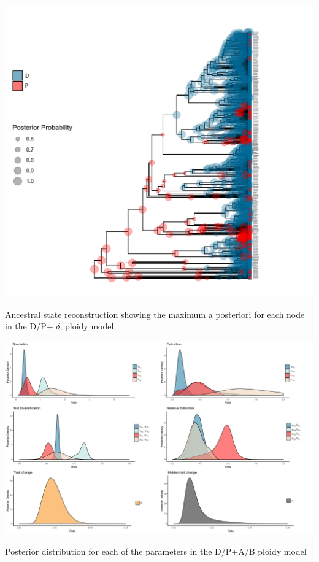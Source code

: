 \begin{suppfigure}
\includegraphics[width=\textwidth]{asrDPdelta.pdf}
\caption{Ancestral state reconstruction showing the maximum a posteriori for each node in the D/P+ $\delta$, ploidy model} %
\label{suppfigure:DPasr}
\end{suppfigure}

\begin{suppfigure}
\includegraphics[width=\textwidth]{hisseDPnodipposteriordist.pdf}
\caption{Posterior distribution for each of the parameters in the D/P+A/B ploidy model} %
\label{suppfigure:DPnodipAB}
\end{suppfigure}

